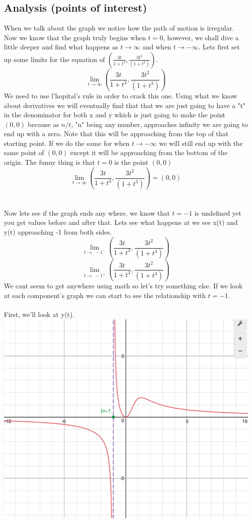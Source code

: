 \documentclass[a4paper,openright, 14pt]{article}
\begin{document}
\subsection*{Analysis (points of interest)}
When we talk about the graph we notice how the path of motion is irregular. Now we know that the graph truly begins when $t=0$, however, we shall dive a little deeper and find what happens as $t \rightarrow \infty$ and when $t \rightarrow -\infty$. Lets first set up some limits for the equation of $(\frac{3t}{1+t^3},\frac{3t^2}{(1+t^3)}) $.
$$\lim_{t\to\infty}(\frac{3t}{1+t^3},\frac{3t^2}{(1+t^3)})  $$
We need to use l'hopital's rule in order to crack this one. Using what we know about derivatives we will eventually find that that we are just going to have a "t" in the denominator for both x and y which is just going to make the point $(0,0)$ because as $n/t$, "n" being any number, approaches infinity we are going to end up with a zero. Note that this will be approaching from the top of that starting point.
If we do the same for when $t \rightarrow -\infty$ we will still end up with the same point of $(0,0)$ except it will be approaching from the bottom of the origin. The funny thing is that $t=0$ is the point $(0,0)$
$$\lim_{t\to\infty}(\frac{3t}{1+t^3},\frac{3t^2}{(1+t^3)})  =(0,0)$$\\\\
Now lets see if the graph ends any where, we know that $t=-1$ is undefined yet you get values before and after that. Lets see what happens at we see x(t) and y(t) approaching -1 from both sides.
$$\lim_{t\to\ -1^-} (\frac{3t}{1+t^3},\frac{3t^2}{(1+t^3)}) $$
$$\lim_{t\to\ -1^+} (\frac{3t}{1+t^3},\frac{3t^2}{(1+t^3)}) $$
We cant seem to get anywhere using math so let's try something else. If we look at each component's graph we can start to see the relationship with $t=-1$. \\
\\
First, we'll look at y(t).\\
\includegraphics[width = 14 cm, height = 7 cm]{Y(t).png}\\
\end{document}
